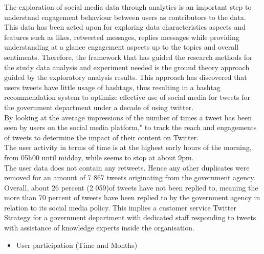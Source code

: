 The exploration of social media data through analytics is an important step to understand engagement behaviour between users as contributors to the data.  This data has been acted upon for exploring data characteristics aspects and features such as likes, retweeted messages, replies messages while providing understanding at a glance engagement aspects up to the topics and overall sentiments.  Therefore, the framework that has guided the research methods for the study data analysis and experiment needed is the ground theory approach guided by the exploratory analysis results.  This approach has discovered that users tweets have little usage of hashtags, thus resulting in a hashtag recommendation system to optimize effective use of social media for tweets for the government department under a decade of using twitter.\\
By looking at the average impressions of the number of times a tweet has been seen by users on the social media platform," to track the reach and engagements of tweets to determine the impact of their content on Twitter.\\
The user activity in terms of time is at the highest early hours of the morning, from 05h00 until midday, while seems to stop at about 9pm.\\
The user data does not contain any retweets.  Hence any other duplicates were removed for an amount of 7 867 tweets originating from the government agency.\\
Overall, about 26 percent (2 059)of tweets have not been replied to, meaning the more than 70 percent of tweets have been replied to by the government agency in relation to its social media policy.  This implies a customer service Twitter Strategy for a government department with dedicated staff responding to tweets with assistance of knowledge experts inside the organisation.\\

\begin{itemize}
    \item User participation (Time and Months)
\end{itemize}


